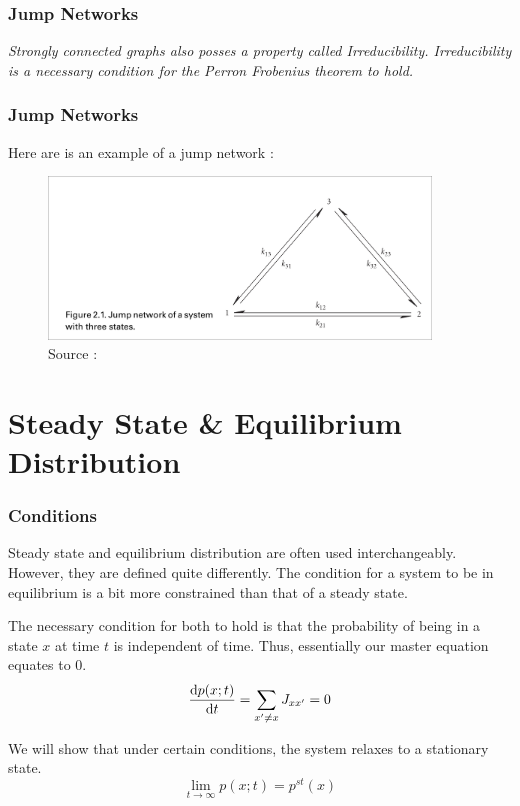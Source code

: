 \documentclass[9pt]{beamer}
\begin{document}
\begin{frame}
  \frametitle{Jump Networks}

  \emph{Strongly connected graphs also posses a property called Irreducibility. Irreducibility is a necessary condition for the Perron Frobenius theorem to hold.}
\end{frame}

\begin{frame}
  \frametitle{Jump Networks}
    Here are is an example of a jump network : 
  \begin{figure}
    \includegraphics[width = 4in]{jump network.png}
    \caption{Source : \cite{PelitiPigolotti2023}}
  \end{figure}
\end{frame}
\section{Steady State \& Equilibrium Distribution}

\begin{frame}
  \frametitle{Conditions}
  Steady state and equilibrium distribution are often used interchangeably. However, they are defined quite differently.
  The condition for a system to be in equilibrium is a bit more constrained than that of a steady state.
  
  The necessary condition for both to hold is that the probability of being in a state $x$ at time $t$ is independent of time.
  Thus, essentially our master equation equates to $0$.
  $$\dv{p(x;t)}{t} = \sum_{x' \neq x} J_{xx'} = 0$$

  We will show that under certain conditions, the system relaxes to a stationary state.
  $$\lim_{t \to \infty} p(x;t) = p^{st}(x)$$
\end{frame}
\end{document}
